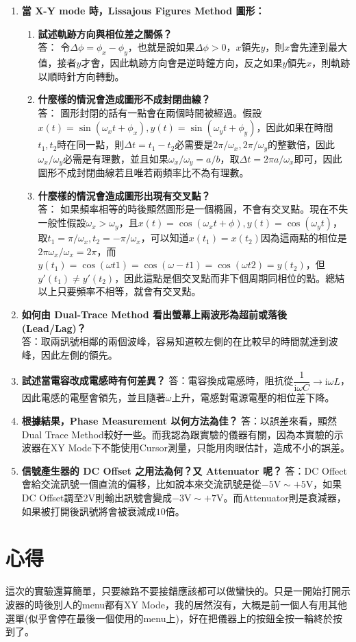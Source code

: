 \documentclass[12pt, a4paper]{article}
\def\large{\fontsize{14}{21}\selectfont}
\newcommand{\img}{\mathrm{i}}
\begin{document}
\begin{enumerate}[itemsep=20pt, topsep=10pt]
	\item {\large\bf 當 X-Y mode 時，Lissajous Figures Method 圖形：} 
		\begin{enumerate}[label=(\alph*)]
			\item {\large\bf 試述軌跡方向與相位差之關係？} \\[5pt]
		答： 令$\Delta \phi = \phi_x - \phi_y$，也就是說如果$\Delta \phi> 0$，$x$領先$y$，則$x$會先達到最大值，接者$y$才會，因此軌跡方向會是逆時鐘方向，反之如果$y$領先$x$，則軌跡以順時針方向轉動。
			\item {\large\bf 什麼樣的情況會造成圖形不成封閉曲線？}\\[5pt]
				答： 圖形封閉的話有一點會在兩個時間被經過。假設$x(t) = \sin(\omega_x t + \phi_x) , y(t) = \sin(\omega_y t + \phi_y)$，因此如果在時間$t_1, t_2$時在同一點，則$\Delta t = t_1 - t_2$必需要是$2 \pi / \omega_x, 2 \pi / \omega_y$的整數倍，因此$\omega_x / \omega_y$必需是有理數，並且如果$\omega_x / \omega_y = a/b$，取$\Delta t = 2 \pi a / \omega_x$即可，因此圖形不成封閉曲線若且唯若兩頻率比不為有理數。
			\item {\large\bf 什麼樣的情況會造成圖形出現有交叉點？}\\[5pt]
				答： 如果頻率相等的時後顯然圖形是一個橢圓，不會有交叉點。現在不失一般性假設$\omega_x > \omega_y$，且$x(t) = \cos(\omega_x t +\phi), y(t) = \cos(\omega_y t)$，取$ t_1 = \pi / \omega_x, t_2 = -\pi / \omega_x$，可以知道$x(t_1) = x(t_2)$因為這兩點的相位是$2 \pi \omega_x / \omega_x = 2 \pi$，而$y(t_1) = \cos(\omega t1) = \cos(\omega -t1) = \cos(\omega t2) = y(t_2)$，但$y'(t_1) \neq y'(t_2)$，因此這點是個交叉點而非下個周期同相位的點。總結以上只要頻率不相等，就會有交叉點。
		\end{enumerate}
	\item {\large\bf 如何由 Dual-Trace Method 看出螢幕上兩波形為超前或落後(Lead/Lag)？}\\[10pt]
		答：取兩訊號相鄰的兩個波峰，容易知道較左側的在比較早的時間就達到波峰，因此左側的領先。
	\item {\large\bf 試述當電容改成電感時有何差異？}
		答：電容換成電感時，阻抗從$\dfrac{1}{\img \omega C} \rightarrow \img \omega L$，因此電感的電壓會領先，並且隨著$\omega$上升，電感對電源電壓的相位差下降。
		
	\item {\large\bf 根據結果，Phase Measurement 以何方法為佳？}
		答：以誤差來看，顯然Dual Trace Method較好一些。而我認為跟實驗的儀器有關，因為本實驗的示波器在XY Mode下不能使用Cursor測量，只能用肉眼估計，造成不小的誤差。
	\item {\large\bf 信號產生器的 DC Offset 之用法為何？又 Attenuator 呢？}
		答：DC Offect會給交流訊號一個直流的偏移，比如說本來交流訊號是從$-5\si{\volt} \sim +5\si{\volt}$，如果DC Offset調至$2 \si{\volt}$則輸出訊號會變成$-3\si{\volt} \sim +7 \si{\volt}$。而Attenuator則是衰減器，如果被打開後訊號將會被衰減成$10$倍。
\end{enumerate}

\section{心得}
這次的實驗還算簡單，只要線路不要接錯應該都可以做蠻快的。只是一開始打開示波器的時後別人的menu都有XY Mode，我的居然沒有，大概是前一個人有用其他選單(似乎會停在最後一個使用的menu上)，好在把儀器上的按鈕全按一輪終於按到了。
\end{document}
